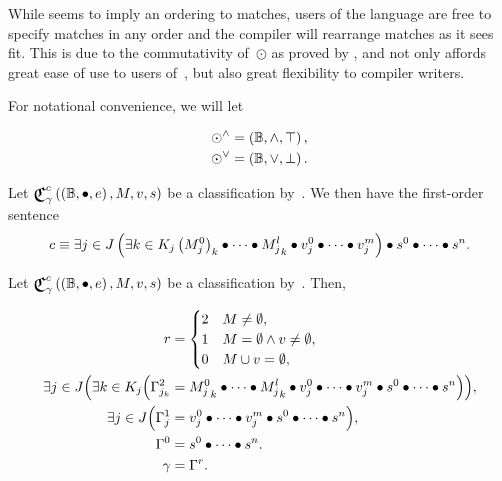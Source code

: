 While  seems to imply an ordering to matches,
  users of the language are free to specify matches in any order
    and the compiler will rearrange matches as it sees fit.
This is due to the commutativity of~$\odot$ as proved by
  ,
    and not only affords great ease of use to users of~\tame{},
      but also great flexibility to compiler writers.

For notational convenience,
  we will let

\begin{align}
  \odot^\land &= \left({\mathbb{B}},{\land},{\top}\right), \\
  \odot^\lor &= \left({\mathbb{B}},{\lor},{\bot}\right).
\end{align}


\def\cpredmatseq{{M^0_j}_k \bullet\cdots\bullet {M^l_j}_k}
\def\cpredvecseq{v^0_j\bullet\cdots\bullet v^m_j}
\def\cpredscalarseq{s^0\bullet\cdots\bullet s^n}


\begin{axiom}
  Let $\Classify^c_\gamma\left(\Monoid\Bool\bullet e,M,v,s\right)$ be a
    classification by~.
  We then have the first-order sentence
  \begin{equation*}
    c \equiv
      {} \Exists{j\in J}{\Exists{k\in K_j}\cpredmatseq\bullet\cpredvecseq}
        \bullet\cpredscalarseq.
  \end{equation*}
\end{axiom}


\begin{axiom}
\indexsym{}
  Let $\Classify^c_\gamma\left(\Monoid\Bool\bullet e,M,v,s\right)$ be a
    classification by~.
  Then,

  \begin{align}
    r &= \begin{cases}
           2 &M\neq\emptyset, \\
           1 &M=\emptyset \land v\neq\emptyset, \\
           0 &M\union v = \emptyset,
         \end{cases} \\
    \exists{j\in J}\Big(\exists{k\in K_j}\Big(
      \Gamma^2_{j_k} &= \cpredmatseq\bullet\cpredvecseq\bullet\cpredscalarseq
    \Big)\Big), \\
    \exists{j\in J}\Big(
      \Gamma^1_j &= \cpredvecseq\bullet\cpredscalarseq
    \Big), \\
    \Gamma^0 &= \cpredscalarseq. \\
    \gamma &= \Gamma^r.
  \end{align}
\end{axiom}


